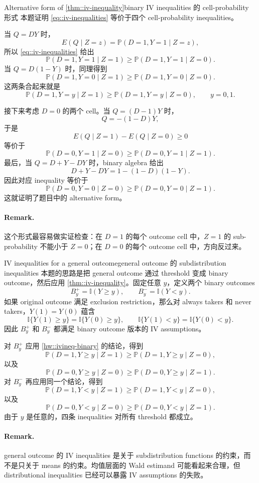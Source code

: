 \begin{exercisesolution}{Alternative form of \cref{thm::iv-inequality}}{binary IV inequalities 的 cell-probability 形式}
本题证明 \cref{eq::iv-inequalities} 等价于四个 cell-probability inequalities。

当 $Q=DY$ 时，
\[
E(Q\mid Z=z)=\mathbb{P}(D=1,Y=1\mid Z=z),
\]
所以 \cref{eq::iv-inequalities} 给出
\[
\mathbb{P}(D=1,Y=1\mid Z=1)
\geq
\mathbb{P}(D=1,Y=1\mid Z=0).
\]
当 $Q=D(1-Y)$ 时，同理得到
\[
\mathbb{P}(D=1,Y=0\mid Z=1)
\geq
\mathbb{P}(D=1,Y=0\mid Z=0).
\]
这两条合起来就是
\[
\mathbb{P}(D=1,Y=y\mid Z=1)
\geq
\mathbb{P}(D=1,Y=y\mid Z=0),
\qquad y=0,1.
\]

接下来考虑 $D=0$ 的两个 cell。当 $Q=(D-1)Y$ 时，
\[
Q=-(1-D)Y,
\]
于是
\[
E(Q\mid Z=1)-E(Q\mid Z=0)\geq 0
\]
等价于
\[
\mathbb{P}(D=0,Y=1\mid Z=0)
\geq
\mathbb{P}(D=0,Y=1\mid Z=1).
\]
最后，当 $Q=D+Y-DY$ 时，binary algebra 给出
\[
D+Y-DY=1-(1-D)(1-Y).
\]
因此对应 inequality 等价于
\[
\mathbb{P}(D=0,Y=0\mid Z=0)
\geq
\mathbb{P}(D=0,Y=0\mid Z=1).
\]
这就证明了题目中的 alternative form。

\paragraph{Remark.}
这个形式最容易做实证检查：在 $D=1$ 的每个 outcome cell 中，$Z=1$ 的 sub-probability 不能小于 $Z=0$；在 $D=0$ 的每个 outcome cell 中，方向反过来。
\end{exercisesolution}

\begin{exercisesolution}{IV inequalities for a general outcome}{general outcome 的 subdistribution inequalities}
本题的思路是把 general outcome 通过 threshold 变成 binary outcome，然后应用 \cref{thm::iv-inequality}。固定任意 $y$，定义两个 binary outcomes
\[
B_y^{+}=\mathbb{I}(Y\geq y),
\qquad
B_y^{-}=\mathbb{I}(Y<y).
\]
如果 original outcome 满足 exclusion restriction，那么对 always takers 和 never takers，$Y(1)=Y(0)$ 蕴含
\[
\mathbb{I}\{Y(1)\geq y\}=\mathbb{I}\{Y(0)\geq y\},
\qquad
\mathbb{I}\{Y(1)< y\}=\mathbb{I}\{Y(0)< y\}.
\]
因此 $B_y^{+}$ 和 $B_y^{-}$ 都满足 binary outcome 版本的 IV assumptions。

对 $B_y^{+}$ 应用 \cref{hw::ivineq-binary} 的结论，得到
\[
\mathbb{P}(D=1,Y\geq y\mid Z=1)
\geq
\mathbb{P}(D=1,Y\geq y\mid Z=0),
\]
以及
\[
\mathbb{P}(D=0,Y\geq y\mid Z=0)
\geq
\mathbb{P}(D=0,Y\geq y\mid Z=1).
\]
对 $B_y^{-}$ 再应用同一个结论，得到
\[
\mathbb{P}(D=1,Y<y\mid Z=1)
\geq
\mathbb{P}(D=1,Y<y\mid Z=0),
\]
以及
\[
\mathbb{P}(D=0,Y<y\mid Z=0)
\geq
\mathbb{P}(D=0,Y<y\mid Z=1).
\]
由于 $y$ 是任意的，四条 inequalities 对所有 threshold 都成立。

\paragraph{Remark.}
general outcome 的 IV inequalities 是关于 subdistribution functions 的约束，而不是只关于 means 的约束。均值层面的 Wald estimand 可能看起来合理，但 distributional inequalities 已经可以暴露 IV assumptions 的失败。
\end{exercisesolution}

